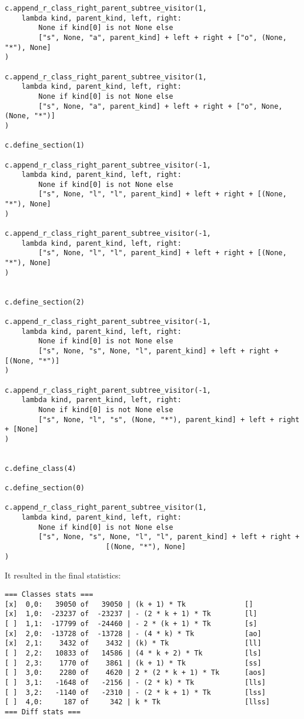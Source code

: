\documentclass[final]{article}
\theoremstyle{definition}
\theoremstyle{definition}
\theoremstyle{remark}
\begin{document}
\begin{lstlisting}
c.append_r_class_right_parent_subtree_visitor(1,
    lambda kind, parent_kind, left, right:
        None if kind[0] is not None else
        ["s", None, "a", parent_kind] + left + right + ["o", (None, "*"), None]
)

c.append_r_class_right_parent_subtree_visitor(1,
    lambda kind, parent_kind, left, right:
        None if kind[0] is not None else
        ["s", None, "a", parent_kind] + left + right + ["o", None, (None, "*")]
)

c.define_section(1)

c.append_r_class_right_parent_subtree_visitor(-1,
    lambda kind, parent_kind, left, right:
        None if kind[0] is not None else
        ["s", None, "l", "l", parent_kind] + left + right + [(None, "*"), None]
)

c.append_r_class_right_parent_subtree_visitor(-1,
    lambda kind, parent_kind, left, right:
        ["s", None, "l", "l", parent_kind] + left + right + [(None, "*"), None]
)


c.define_section(2)

c.append_r_class_right_parent_subtree_visitor(-1,
    lambda kind, parent_kind, left, right:
        None if kind[0] is not None else
        ["s", None, "s", None, "l", parent_kind] + left + right + [(None, "*")]
)

c.append_r_class_right_parent_subtree_visitor(-1,
    lambda kind, parent_kind, left, right:
        None if kind[0] is not None else
        ["s", None, "l", "s", (None, "*"), parent_kind] + left + right + [None]
)


c.define_class(4)

c.define_section(0)

c.append_r_class_right_parent_subtree_visitor(1,
    lambda kind, parent_kind, left, right:
        None if kind[0] is not None else
        ["s", None, "s", None, "l", "l", parent_kind] + left + right +
                        [(None, "*"), None]
)
\end{lstlisting}

It resulted in the final statistics:

\begin{lstlisting}
=== Classes stats ===
[x]  0,0:   39050 of   39050 | (k + 1) * Tk              []
[x]  1,0:  -23237 of  -23237 | - (2 * k + 1) * Tk        [l]
[ ]  1,1:  -17799 of  -24460 | - 2 * (k + 1) * Tk        [s]
[x]  2,0:  -13728 of  -13728 | - (4 * k) * Tk            [ao]
[x]  2,1:    3432 of    3432 | (k) * Tk                  [ll]
[ ]  2,2:   10833 of   14586 | (4 * k + 2) * Tk          [ls]
[ ]  2,3:    1770 of    3861 | (k + 1) * Tk              [ss]
[ ]  3,0:    2280 of    4620 | 2 * (2 * k + 1) * Tk      [aos]
[ ]  3,1:   -1648 of   -2156 | - (2 * k) * Tk            [lls]
[ ]  3,2:   -1140 of   -2310 | - (2 * k + 1) * Tk        [lss]
[ ]  4,0:     187 of     342 | k * Tk                    [llss]
=== Diff stats ===
\end{lstlisting}
\end{document}
